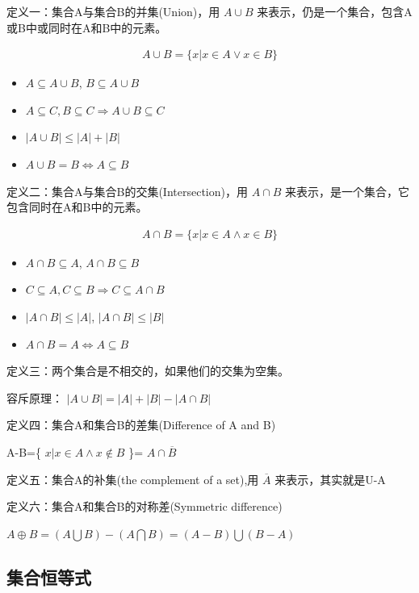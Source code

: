 \documentclass[12pt,a4paper,oneside]{ctexart}
\begin{document}
定义一：集合A与集合B的并集(Union)，用 \(A\cup B\) 来表示，仍是一个集合，包含A或B中或同时在A和B中的元素。

\[\begin{gathered}
A\cup B=\{x|x\in A \vee x\in B\}
\end{gathered}\]

\begin{itemize}
\item
  \(A\subseteq A\cup B\), \(B\subseteq A\cup B\)
\item
  \(A\subseteq C,B\subseteq C\Rightarrow A\cup B\subseteq C\)
\item
  \(|A\cup B|\leqslant|A|+|B|\)
\item
  \(A\cup B=B\Leftrightarrow A\subseteq B\)
\end{itemize}

定义二：集合A与集合B的交集(Intersection)，用 \(A\cap B\) 来表示，是一个集合，它包含同时在A和B中的元素。

\[\begin{gathered}
A\cap B=\{x|x\in A\wedge x\in B\}
\end{gathered}\]

\begin{itemize}
\item
  \(A\cap B\subseteq A\), \(A\cap B\subseteq B\)
\item
  \(C\subseteq A,C\subseteq B\Rightarrow C\subseteq A\cap B\)
\item
  \(|A\cap B|\leqslant|A|\), \(|A\cap B|\leqslant|B|\)
\item
  \(A\cap B= A\Leftrightarrow A\subseteq B\)
\end{itemize}

定义三：两个集合是不相交的，如果他们的交集为空集。

容斥原理： \(|A\cup B|=|A|+|B|-|A\cap B|\)

定义四：集合A和集合B的差集(Difference of A and B)

A-B=\{ \(x|x\in A\wedge x\notin B\) \}= \(A\cap\overline{B}\)

定义五：集合A的补集(the complement of a set),用 \(\overline{A}\) 来表示，其实就是U-A

定义六：集合A和集合B的对称差(Symmetric difference)

\(A\oplus B=(A\bigcup B)-(A\bigcap B)=(A-B)\bigcup(B-A)\)

\subsection*{集合恒等式}
\end{document}
